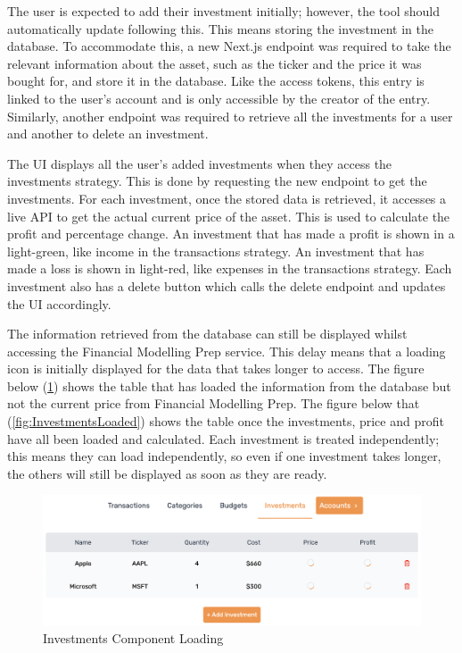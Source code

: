 The user is expected to add their investment initially; however, the tool should automatically update following this. This means storing the investment in the database. To accommodate this, a new Next.js endpoint was required to take the relevant information about the asset, such as the ticker and the price it was bought for, and store it in the database. Like the access tokens, this entry is linked to the user's account and is only accessible by the creator of the entry. Similarly, another endpoint was required to retrieve all the investments for a user and another to delete an investment.

The UI displays all the user's added investments when they access the investments strategy. This is done by requesting the new endpoint to get the investments. For each investment, once the stored data is retrieved, it accesses a live API to get the actual current price of the asset. This is used to calculate the profit and percentage change. An investment that has made a profit is shown in a light-green, like income in the transactions strategy. An investment that has made a loss is shown in light-red, like expenses in the transactions strategy. Each investment also has a delete button which calls the delete endpoint and updates the UI accordingly.

The information retrieved from the database can still be displayed whilst accessing the Financial Modelling Prep service. This delay means that a loading icon is initially displayed for the data that takes longer to access. The figure below (\ref{fig:InvestmentsLoading}) shows the table that has loaded the information from the database but not the current price from Financial Modelling Prep. The figure below that (\ref{fig:InvestmentsLoaded}) shows the table once the investments, price and profit have all been loaded and calculated. Each investment is treated independently; this means they can load independently, so even if one investment takes longer, the others will still be displayed as soon as they are ready.

\begin{figure}[H]
	\centering
	\includegraphics[width=\textwidth]{images/investments_loading.png}
	\caption{Investments Component Loading}
	\label{fig:InvestmentsLoading}
\end{figure}

